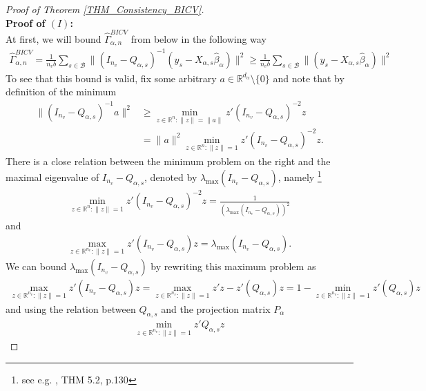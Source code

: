 \documentclass[Research_Module_ES.tex]{subfiles}
\begin{document}
\begin{proof}[Proof of Theorem \ref{THM_Consistency_BICV}]~\\
	\textbf{Proof of $(I)$:}\\
	At first, we will bound $\hat{\Gamma}_{\alpha,n}^{BICV}$ from below in the following way
	\begin{align*}
	\hat{\Gamma}_{\alpha,n}^{BICV} 
	= \frac{1}{n_vb}\sum_{s\in \mathcal{B}}\lVert (I_{n_v}-Q_{\alpha,s})^{-1}(y_s-X_{\alpha,s}\hat{\beta}_\alpha)\rVert^2 
	\ge \frac{1}{n_vb}\sum_{s\in \mathcal{B}}\lVert (y_s-X_{\alpha,s}\hat{\beta}_\alpha)\rVert^2 
	\end{align*}
	To see that this bound is valid, fix some arbitrary $a\in \mathbb{R}^{d_\alpha}\setminus \{ 0\}$ and note that by definition of the minimum
	\begin{align}
	\lVert (I_{n_v}-Q_{\alpha,s})^{-1} a\rVert ^2 
	&\ge \min_{z\in \mathbb{R}^n : \lVert z\rVert=\lVert a\rVert}z'(I_{n_v}-Q_{\alpha,s})^{-2}z \nonumber\\
	&= \lVert a\rVert^2 \min_{z\in \mathbb{R}^n : \lVert z\rVert=1}z'(I_{n_v}-Q_{\alpha,s})^{-2}z. \label{proof_BICV_7}
	\end{align}
	There is a close relation between the minimum problem on the right and the maximal eigenvalue of $I_{n_v}-Q_{\alpha,s}$, denoted by $\lambda_{\max}(I_{n_v}-Q_{\alpha,s})$, namely \footnote{see e.g. \cite{ryabenkii}, THM 5.2, p.130}
	\begin{align}
	\min_{z\in \mathbb{R}^n : \lVert z\rVert=1}z'(I_{n_v}-Q_{\alpha,s})^{-2}z = \frac{1}{(\lambda_{\max}(I_{n_v}-Q_{\alpha,s}))^2}\label{proof_BICV_8}
	\end{align}
	and 
	\begin{align*}
	\max_{z\in \mathbb{R}^{n_v} : \lVert z\rVert=1}z'(I_{n_v}-Q_{\alpha,s})z=\lambda_{\max}(I_{n_v}-Q_{\alpha,s}).
	\end{align*}
	We can bound $\lambda_{\max}(I_{n_v}-Q_{\alpha,s})$ by rewriting this maximum problem as
	\begin{align*}
	\max_{z\in \mathbb{R}^{n_v} : \lVert z\rVert=1}z'(I_{n_v}-Q_{\alpha,s})z 
	= \max_{z\in \mathbb{R}^{n_v} : \lVert z\rVert=1}z'z - z'(Q_{\alpha,s})z 
	= 1- \min_{z\in \mathbb{R}^{n_v} : \lVert z\rVert=1}z'(Q_{\alpha,s})z 
	\end{align*}
	and using the relation between $Q_{\alpha,s}$ and the projection matrix $P_\alpha$
	\begin{align*}
	\min_{z\in \mathbb{R}^{n_v} : \lVert z\rVert=1}z'Q_{\alpha,s}z

\end{align*}
\end{proof}
\end{document}
